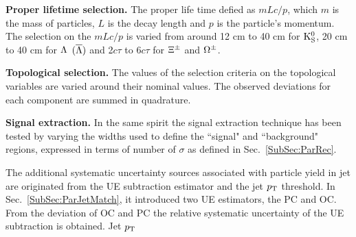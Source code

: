 \textbf{Proper lifetime selection.} The proper life time defied as $mLc/p$, which $m$ is the mass of particles, $L$ is the decay length and $p$ is the particle's momentum. The selection on the $mLc/p$ is varied from around 12 cm to 40 cm for ${\rm K}^{0}_{\rm{S}}$, 20 cm to 40 cm for $\Lambda$ $(\overline{\Lambda})$ and 2$c\tau$ to 6$c\tau$ for $\Xi^{\pm}$ and $\Omega^{\pm}$.

\textbf{Topological selection.} The values of the selection criteria on the topological variables are varied around their nominal values. The observed deviations for each component are summed in quadrature.

\textbf{Signal extraction.} In the same spirit the signal extraction technique has been tested by varying the widths used to define the ``signal" and ``background" regions, expressed in terms of number of $\sigma$ as defined in Sec.~\ref{SubSec:ParRec}.

The additional systematic uncertainty sources associated with particle yield in jet are originated from the UE subtraction estimator and the jet $p_{\rm T}$ threshold. In Sec.~\ref{SubSec:ParJetMatch}, it introduced two UE estimators, the PC and OC. From the deviation of OC and PC the relative systematic uncertainty of the UE subtraction is obtained. Jet $p_{\rm T}$ 
 
